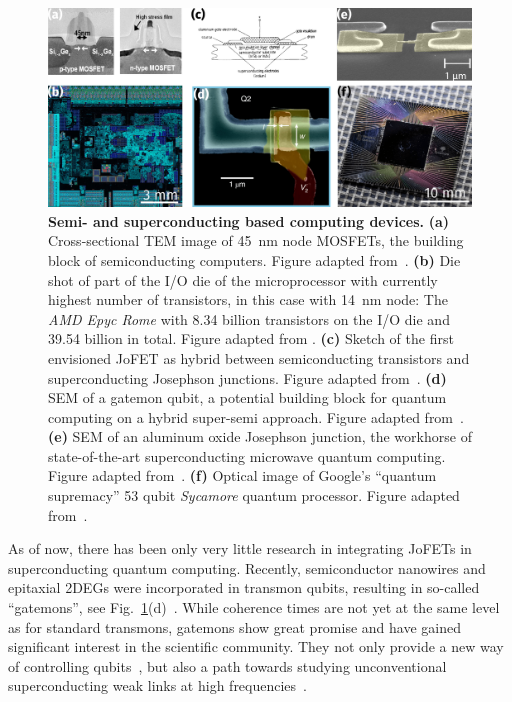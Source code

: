 \begin{figure}[t]
	\centering
	\includegraphics[width=\linewidth]{chapter-introduction/figs/intro_computing.svg.png}
	\caption{
		\textbf{Semi- and superconducting based computing devices.}
		\textbf{(a)} Cross-sectional TEM image of \SI{45}{\nano\meter} node MOSFETs, the building block of semiconducting computers.
		Figure adapted from~\cite{thompsonLogicNanotechnologyFeaturing2004}.
		\textbf{(b)} Die shot of part of the I/O die of the microprocessor with currently highest number of transistors, in this case with \SI{14}{\nano\meter} node: The \textit{AMD Epyc Rome} with \num{8.34} billion transistors on the I/O die and \num{39.54} billion in total.
		Figure adapted from \cite{fritzAMDRyzen36002019}.
		\textbf{(c)} Sketch of the first envisioned JoFET as hybrid between semiconducting transistors and superconducting Josephson junctions.
		Figure adapted from~\cite{clarkFeasibilityHybridJosephson1980}.
		\textbf{(d)} SEM of a gatemon qubit, a potential building block for quantum computing on a hybrid super-semi approach.
		Figure adapted from~\cite{casparisSuperconductingGatemonQubit2018}.
		\textbf{(e)} SEM of an aluminum oxide Josephson junction, the workhorse of state-of-the-art superconducting microwave quantum  computing.
		Figure adapted from~\cite{langfordExperimentallySimulatingDynamics2017}.
		\textbf{(f)} Optical image of Google's \enquote{quantum supremacy} 53 qubit \textit{Sycamore} quantum processor.
		Figure adapted from~\cite{shanklandTakeLookGoogle2020}. 
	}
	\label{fig:introcomputing}
\end{figure}

As of now, there has been only very little research in integrating JoFETs in superconducting quantum computing.
%
Recently, semiconductor nanowires and epitaxial 2DEGs were incorporated in transmon qubits, resulting in so-called \enquote{gatemons}, see Fig.~\ref{fig:introcomputing}(d)~\cite{delangeRealizationMicrowaveQuantum2015,larsenSemiconductorNanowireBasedSuperconductingQubit2015,casparisGatemonBenchmarkingTwoQubit2016a,casparisSuperconductingGatemonQubit2018,luthiEvolutionNanowireTransmon2018}.
%
While coherence times are not yet at the same level as for standard transmons, gatemons show great promise and have gained significant interest in the scientific community.
%
They not only provide a new way of controlling qubits~\cite{shimSemiconductorinspiredDesignPrinciples2016}, but also a path towards studying unconventional superconducting weak links at high frequencies~\cite{tahanGrapheneQubitMotivates2019}.





